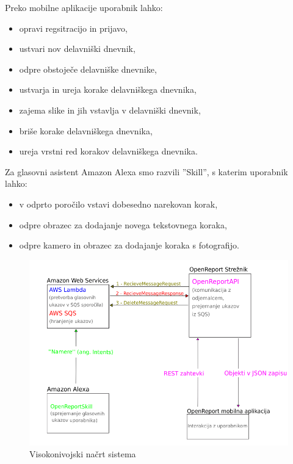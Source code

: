 \documentclass[a4paper, 12pt]{book}
\begin{document}
\noindent Preko mobilne aplikacije uporabnik lahko:
\begin{itemize}
	\item opravi regsitracijo in prijavo,
	\item ustvari nov delavniški dnevnik,
	\item odpre obstoječe delavniške dnevnike,
	\item ustvarja in ureja korake delavniškega dnevnika,
	\item zajema slike in jih vstavlja v delavniški dnevnik,
	\item briše korake delavniškega dnevnika,
	\item ureja vrstni red korakov delavniškega dnevnika.
\end{itemize}

Za glasovni asistent Amazon Alexa smo razvili ''Skill'', s katerim uporabnik lahko:

\begin{itemize}
	\item v odprto poročilo vstavi dobesedno narekovan korak,
	\item odpre obrazec za dodajanje novega tekstovnega koraka,
	\item odpre kamero in obrazec za dodajanje koraka s fotografijo.
\end{itemize}

\begin{figure}[H]
\begin{center}
\includegraphics[width=13cm]{plan}
\end{center}
\caption{Visokonivojski načrt sistema}
\label{plan}
\end{figure}
\end{document}
